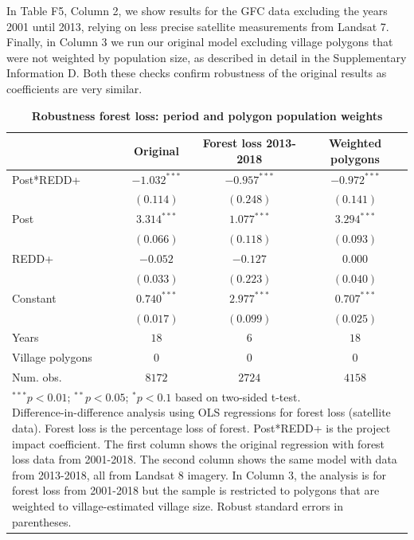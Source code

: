 \documentclass[
]{article}
\begin{document}
In Table F5, Column 2, we show results for the GFC data excluding the
years 2001 until 2013, relying on less precise satellite measurements
from Landsat 7. Finally, in Column 3 we run our original model excluding
village polygons that were not weighted by population size, as described
in detail in the Supplementary Information D. Both these checks confirm
robustness of the original results as coefficients are very similar.

\begin{table}[h]
\caption{\textbf{Robustness forest loss: period and polygon population weights}}
\begin{center}
\begin{tabular}{l c c c}
\hline
 & Original & Forest loss 2013-2018 & Weighted polygons \\
\hline
Post*REDD+       & $-1.032^{***}$ & $-0.957^{***}$ & $-0.972^{***}$ \\
                 & $(0.114)$      & $(0.248)$      & $(0.141)$      \\
Post             & $3.314^{***}$  & $1.077^{***}$  & $3.294^{***}$  \\
                 & $(0.066)$      & $(0.118)$      & $(0.093)$      \\
REDD+            & $-0.052$       & $-0.127$       & $0.000$        \\
                 & $(0.033)$      & $(0.223)$      & $(0.040)$      \\
Constant         & $0.740^{***}$  & $2.977^{***}$  & $0.707^{***}$  \\
                 & $(0.017)$      & $(0.099)$      & $(0.025)$      \\
\hline
Years            & $18$           & $6$            & $18$           \\
Village polygons & $0$            & $0$            & $0$            \\
Num. obs.        & $8172$         & $2724$         & $4158$         \\
\hline
\multicolumn{4}{l}{\scriptsize{\parbox{.7\linewidth}{\vspace{2pt}$^{***}p<0.01$; $^{**}p<0.05$; $^{*}p<0.1$ based on two-sided t-test.\\
       Difference-in-difference analysis using OLS regressions for forest loss (satellite data). Forest loss is the percentage loss of forest. Post*REDD+ is the project impact coefficient. The first column shows the original regression with forest loss data from 2001-2018. The second column shows the same model with data from 2013-2018, all from Landsat 8 imagery. In Column 3, the analysis is for forest loss from 2001-2018 but the sample is restricted to polygons that are weighted to village-estimated village size. Robust standard errors in parentheses.}}}
\end{tabular}
\label{table:coefficients}
\end{center}
\end{table}
\clearpage
\end{document}
